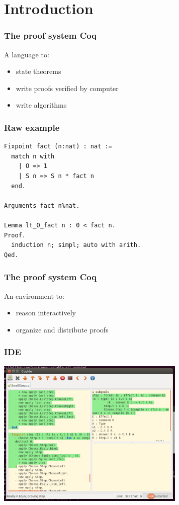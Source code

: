 \section{Introduction}
\begin{frame}
  \frametitle{The proof system Coq}
  A language to:
  \begin{itemize}
    \item state theorems
    \item write proofs verified by computer
    \item write algorithms
  \end{itemize}
\end{frame}

\begin{frame}[fragile]
  \frametitle{Raw example}
  \begin{verbatim}
Fixpoint fact (n:nat) : nat :=
  match n with
    | O => 1
    | S n => S n * fact n
  end.

Arguments fact n%nat.

Lemma lt_O_fact n : 0 < fact n.
Proof.
  induction n; simpl; auto with arith.
Qed.
  \end{verbatim}
\end{frame}

\begin{frame}
  \frametitle{The proof system Coq}
  An environment to:
  \begin{itemize}
    \item reason interactively
    \item organize and distribute proofs
  \end{itemize}
\end{frame}

\begin{frame}
  \frametitle{IDE}
  \begin{center}
    \includegraphics[width=9cm]{images/ide}
  \end{center}
\end{frame}

